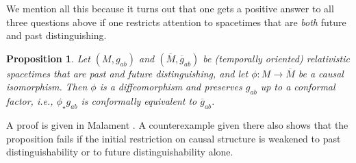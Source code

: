 \documentclass [12] {article}
\theoremstyle{plain}
\newtheorem{proposition}{Proposition}[subsection]
\numberwithin{figure}{subsection}
\numberwithin{proposition}{subsection}
\begin{document}
We mention all this because it turns out that one gets a positive answer to all three questions above if one restricts attention to spacetimes that are \emph{both} future and past distinguishing.

\begin{proposition} \label{J Math Phys prop} 
Let $(M, g_{ab})$ and   $(\overline{M}, \overline{g}_{ab})$ be (temporally oriented) relativistic spacetimes that are past and future distinguishing, and let $\phi: M \rightarrow \overline{M}$ be a causal isomorphism.  Then  $\phi$ is a diffeomorphism and preserves $ g_{ab}$ up to a conformal factor, i.e., $\phi_{\star}g_{ab}$ is conformally equivalent to $\overline{g}_{ab}$.    
\end{proposition}

A proof is given in Malament . A counterexample given there also shows that the proposition fails if the  initial restriction on causal structure is weakened to past distinguishability or to future distinguishability alone.




\newpage

%
%


\end{document}
